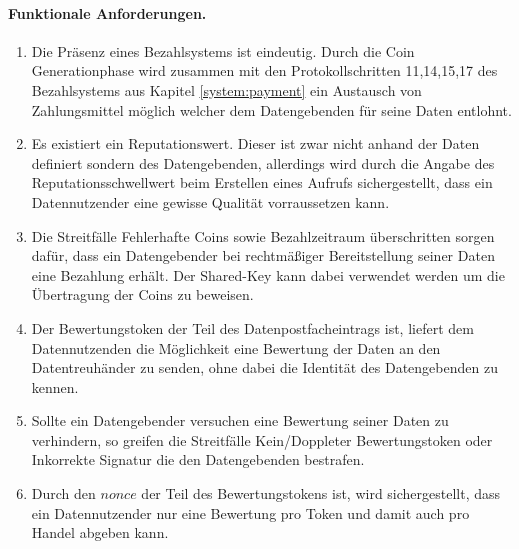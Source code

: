\documentclass[
	fontsize=12pt,
	headings=small,
	parskip=half,           %
	bibliography=totoc,
	numbers=noenddot,       %
	open=any,               %
]{scrreprt}
\begin{document}
\paragraph{Funktionale Anforderungen.}
\begin{enumerate}
    \item Die Präsenz eines Bezahlsystems ist eindeutig. Durch die Coin Generationphase wird zusammen mit den Protokollschritten 11,14,15,17 des Bezahlsystems aus Kapitel \ref{system:payment} ein Austausch von Zahlungsmittel möglich welcher dem Datengebenden für seine Daten entlohnt.
    \item Es existiert ein Reputationswert. Dieser ist zwar nicht anhand der Daten definiert sondern des Datengebenden, allerdings wird durch die Angabe des Reputationsschwellwert beim Erstellen eines Aufrufs sichergestellt, dass ein Datennutzender eine gewisse Qualität vorraussetzen kann.
    \item Die Streitfälle Fehlerhafte Coins sowie Bezahlzeitraum überschritten sorgen dafür, dass ein Datengebender bei rechtmäßiger Bereitstellung seiner Daten eine Bezahlung erhält. Der Shared-Key kann dabei verwendet werden um die Übertragung der Coins zu beweisen.
    \item Der Bewertungstoken der Teil des Datenpostfacheintrags ist, liefert dem Datennutzenden die Möglichkeit eine Bewertung der Daten an den Datentreuhänder zu senden, ohne dabei die Identität des Datengebenden zu kennen.
    \item Sollte ein Datengebender versuchen eine Bewertung seiner Daten zu verhindern, so greifen die Streitfälle Kein/Doppleter Bewertungstoken oder Inkorrekte Signatur die den Datengebenden bestrafen.
    \item Durch den $nonce$ der Teil des Bewertungstokens ist, wird sichergestellt, dass ein Datennutzender nur eine Bewertung pro Token und damit auch pro Handel abgeben kann.
\end{enumerate} 
\end{document}
